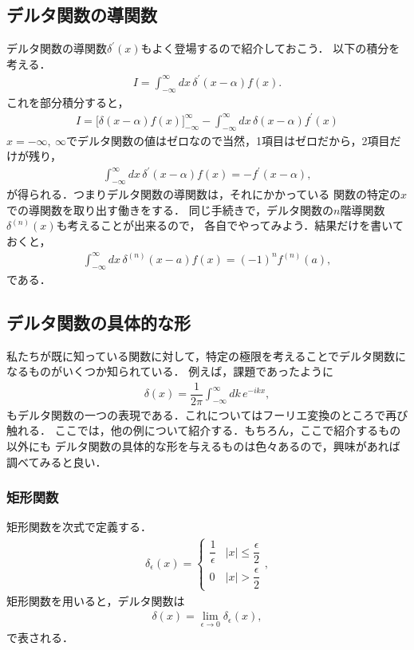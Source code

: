 \subsection{デルタ関数の導関数}
%
デルタ関数の導関数$\delta^{\prime}(x)$もよく登場するので紹介しておこう．
以下の積分を考える．
\begin{align}
  I = \int_{-\infty}^{\infty}dx\,\delta^{\prime} \left(x-\alpha\right) f\left(x\right).
\end{align}
これを部分積分すると，
\begin{align}
  I = \biggl[\delta\left(x-\alpha\right)f\left(x\right)\biggr]_{-\infty}^{\infty} - \int_{-\infty}^{\infty}dx\, \delta(x-\alpha) f^{\prime}\left(x\right) 
\end{align}
%
$x=-\infty,~\infty$でデルタ関数の値はゼロなので当然，1項目はゼロだから，2項目だけが残り，
\begin{align}
  \int_{-\infty}^{\infty}dx\, \delta^{\prime}\left(x-\alpha\right)f\left(x\right) = - f^{\prime}\left(x-\alpha\right), 
\end{align}
が得られる．つまりデルタ関数の導関数は，それにかかっている
関数の特定の$x$での導関数を取り出す働きをする．
同じ手続きで，デルタ関数の$n$階導関数$\delta^{(n)}\left(x\right)$も考えることが出来るので，
各自でやってみよう．結果だけを書いておくと，
\begin{align}
  \int_{-\infty}^{\infty}dx\, \delta^{\left(n\right)}\left(x-a\right) f\left(x\right) = \left(-1\right)^{n}f^{\left(n\right)}\left(a\right), 
\end{align}
である．
%
\subsection{デルタ関数の具体的な形}
%
私たちが既に知っている関数に対して，特定の極限を考えることでデルタ関数になるものがいくつか知られている．
例えば，課題であったように
\begin{align}
 \delta\left(x\right) = \dfrac{1}{2\pi}\int_{-\infty}^{\infty}dk\,e^{-ikx}, 
\end{align}
もデルタ関数の一つの表現である．これについてはフーリエ変換のところで再び触れる．
ここでは，他の例について紹介する．もちろん，ここで紹介するもの以外にも
デルタ関数の具体的な形を与えるものは色々あるので，興味があれば調べてみると良い．
%
\subsubsection{矩形関数}
%
矩形関数を次式で定義する．
\begin{align}
 \delta_{\epsilon}\left(x\right) =
 \begin{cases}
   \dfrac{1}{\epsilon} & \left|x\right|\leq \dfrac{\epsilon}{2} \\[.2cm]
   0                   & \left|x\right|>    \dfrac{\epsilon}{2} 
 \end{cases},
\end{align}
%
矩形関数を用いると，デルタ関数は
\begin{align}
  \delta\left(x\right) = \lim_{\epsilon \to 0}\delta_{\epsilon}\left(x\right), 
\end{align}
で表される．
%
